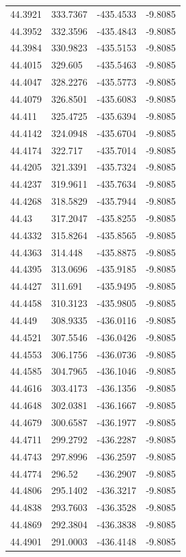 \begin{table}[H]
\begin{tabular}{llll}
44.3921 & 333.7367 & -435.4533 & -9.8085 \\
44.3952 & 332.3596 & -435.4843 & -9.8085 \\
44.3984 & 330.9823 & -435.5153 & -9.8085 \\
44.4015 & 329.605 & -435.5463 & -9.8085 \\
44.4047 & 328.2276 & -435.5773 & -9.8085 \\
44.4079 & 326.8501 & -435.6083 & -9.8085 \\
44.411 & 325.4725 & -435.6394 & -9.8085 \\
44.4142 & 324.0948 & -435.6704 & -9.8085 \\
44.4174 & 322.717 & -435.7014 & -9.8085 \\
44.4205 & 321.3391 & -435.7324 & -9.8085 \\
44.4237 & 319.9611 & -435.7634 & -9.8085 \\
44.4268 & 318.5829 & -435.7944 & -9.8085 \\
44.43 & 317.2047 & -435.8255 & -9.8085 \\
44.4332 & 315.8264 & -435.8565 & -9.8085 \\
44.4363 & 314.448 & -435.8875 & -9.8085 \\
44.4395 & 313.0696 & -435.9185 & -9.8085 \\
44.4427 & 311.691 & -435.9495 & -9.8085 \\
44.4458 & 310.3123 & -435.9805 & -9.8085 \\
44.449 & 308.9335 & -436.0116 & -9.8085 \\
44.4521 & 307.5546 & -436.0426 & -9.8085 \\
44.4553 & 306.1756 & -436.0736 & -9.8085 \\
44.4585 & 304.7965 & -436.1046 & -9.8085 \\
44.4616 & 303.4173 & -436.1356 & -9.8085 \\
44.4648 & 302.0381 & -436.1667 & -9.8085 \\
44.4679 & 300.6587 & -436.1977 & -9.8085 \\
44.4711 & 299.2792 & -436.2287 & -9.8085 \\
44.4743 & 297.8996 & -436.2597 & -9.8085 \\
44.4774 & 296.52 & -436.2907 & -9.8085 \\
44.4806 & 295.1402 & -436.3217 & -9.8085 \\
44.4838 & 293.7603 & -436.3528 & -9.8085 \\
44.4869 & 292.3804 & -436.3838 & -9.8085 \\
44.4901 & 291.0003 & -436.4148 & -9.8085 \\

\end{tabular}
\end{table}
